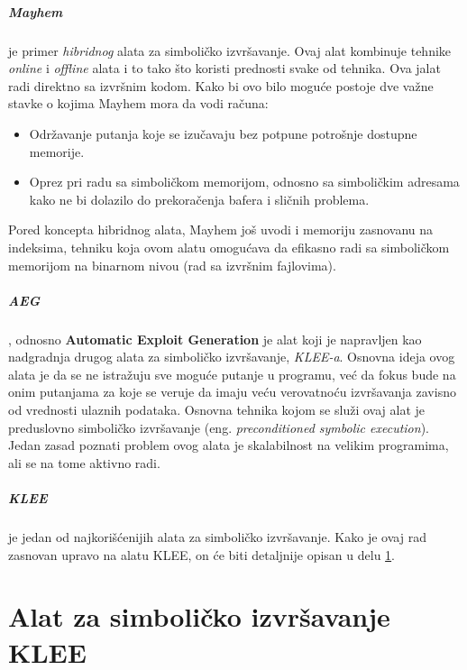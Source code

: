 \documentclass[12pt,oneside]{memoir}
\begin{document}
\paragraph{Mayhem}\cite{mayhem} je primer \textit{hibridnog} alata za simboličko izvršavanje. Ovaj alat kombinuje tehnike \textit{online} i \textit{offline} alata i to tako što koristi prednosti svake od tehnika. Ova jalat radi direktno sa izvršnim kodom. Kako bi ovo bilo moguće postoje dve važne stavke o kojima Mayhem mora da vodi računa:
\begin{itemize}
    \item Održavanje putanja koje se izučavaju bez potpune potrošnje dostupne memorije.
    
    \item Oprez pri radu sa simboličkom memorijom, odnosno sa simboličkim adresama kako ne bi dolazilo do prekoračenja bafera i sličnih problema.
\end{itemize} 
\medskip
Pored koncepta hibridnog alata, Mayhem još uvodi i memoriju zasnovanu na indeksima, tehniku koja ovom alatu omogućava da efikasno radi sa simboličkom memorijom na binarnom nivou (rad sa izvršnim fajlovima).

\paragraph{AEG}\cite{aeg}, odnosno \textbf{Automatic Exploit Generation} je alat koji je napravljen kao nadgradnja drugog alata za simboličko izvršavanje, \textit{KLEE-a}\cite{klee}. Osnovna ideja ovog alata je da se ne istražuju sve moguće putanje u programu, već da fokus bude na onim putanjama za koje se veruje da imaju veću verovatnoću izvršavanja zavisno od vrednosti ulaznih podataka. Osnovna tehnika kojom se služi ovaj alat je preduslovno simboličko izvršavanje (eng. \textit{preconditioned symbolic execution}). Jedan zasad poznati problem ovog alata je skalabilnost na velikim programima, ali se na tome aktivno radi.

\paragraph{KLEE}\cite{klee} je jedan od najkorišćenijih alata za simboličko izvršavanje. Kako je ovaj rad zasnovan upravo na alatu KLEE, on će biti detaljnije opisan u delu \ref{KLEE}.

\chapter{Alat za simboličko izvršavanje KLEE} \label{KLEE}
\end{document}
